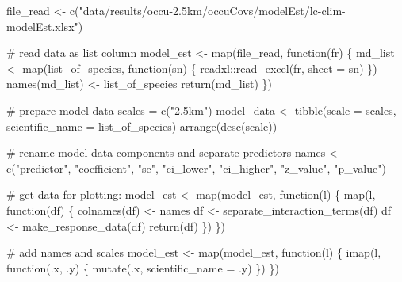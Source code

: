 \documentclass[]{article}
\newenvironment{Shaded}{}{}
\newcommand{\CommentTok}[1]{\textcolor[rgb]{0.00,0.50,0.00}{#1}}
\newcommand{\ControlFlowTok}[1]{\textcolor[rgb]{0.00,0.00,1.00}{#1}}
\newcommand{\DataTypeTok}[1]{#1}
\newcommand{\KeywordTok}[1]{\textcolor[rgb]{0.00,0.00,1.00}{#1}}
\newcommand{\NormalTok}[1]{#1}
\newcommand{\OperatorTok}[1]{#1}
\newcommand{\StringTok}[1]{\textcolor[rgb]{0.00,0.50,0.50}{#1}}
\begin{document}
\begin{Shaded}
\begin{Highlighting}[]
\NormalTok{file_read <-}\StringTok{ }\KeywordTok{c}\NormalTok{(}\StringTok{"data/results/occu-2.5km/occuCovs/modelEst/lc-clim-modelEst.xlsx"}\NormalTok{)}

\CommentTok{# read data as list column}
\NormalTok{model_est <-}\StringTok{ }\KeywordTok{map}\NormalTok{(file_read, }\ControlFlowTok{function}\NormalTok{(fr) \{}
\NormalTok{  md_list <-}\StringTok{ }\KeywordTok{map}\NormalTok{(list_of_species, }\ControlFlowTok{function}\NormalTok{(sn) \{}
\NormalTok{    readxl}\OperatorTok{::}\KeywordTok{read_excel}\NormalTok{(fr, }\DataTypeTok{sheet =}\NormalTok{ sn)}
\NormalTok{  \})}
  \KeywordTok{names}\NormalTok{(md_list) <-}\StringTok{ }\NormalTok{list_of_species}
  \KeywordTok{return}\NormalTok{(md_list)}
\NormalTok{\})}

\CommentTok{# prepare model data}
\NormalTok{scales =}\StringTok{ }\KeywordTok{c}\NormalTok{(}\StringTok{"2.5km"}\NormalTok{)}
\NormalTok{model_data <-}\StringTok{ }\KeywordTok{tibble}\NormalTok{(}\DataTypeTok{scale =}\NormalTok{ scales, }
                              \DataTypeTok{scientific_name =}\NormalTok{ list_of_species) }\OperatorTok{%
\StringTok{  }\KeywordTok{arrange}\NormalTok{(}\KeywordTok{desc}\NormalTok{(scale))}

\CommentTok{# rename model data components and separate predictors}
\NormalTok{names <-}\StringTok{ }\KeywordTok{c}\NormalTok{(}\StringTok{"predictor"}\NormalTok{, }\StringTok{"coefficient"}\NormalTok{, }\StringTok{"se"}\NormalTok{, }\StringTok{"ci_lower"}\NormalTok{, }
           \StringTok{"ci_higher"}\NormalTok{, }\StringTok{"z_value"}\NormalTok{, }\StringTok{"p_value"}\NormalTok{)}

\CommentTok{# get data for plotting:}
\NormalTok{model_est <-}\StringTok{ }\KeywordTok{map}\NormalTok{(model_est, }\ControlFlowTok{function}\NormalTok{(l) \{}
  \KeywordTok{map}\NormalTok{(l, }\ControlFlowTok{function}\NormalTok{(df) \{}
    \KeywordTok{colnames}\NormalTok{(df) <-}\StringTok{ }\NormalTok{names}
\NormalTok{    df <-}\StringTok{ }\KeywordTok{separate_interaction_terms}\NormalTok{(df)}
\NormalTok{    df <-}\StringTok{ }\KeywordTok{make_response_data}\NormalTok{(df) }
    \KeywordTok{return}\NormalTok{(df)}
\NormalTok{  \})}
\NormalTok{\})}

\CommentTok{# add names and scales}
\NormalTok{model_est <-}\StringTok{ }\KeywordTok{map}\NormalTok{(model_est, }\ControlFlowTok{function}\NormalTok{(l) \{}
  \KeywordTok{imap}\NormalTok{(l, }\ControlFlowTok{function}\NormalTok{(.x, .y) \{}
    \KeywordTok{mutate}\NormalTok{(.x, }\DataTypeTok{scientific_name =}\NormalTok{ .y)}
\NormalTok{  \})}
\NormalTok{\})}

}
\end{Highlighting}
\end{Shaded}
\end{document}

